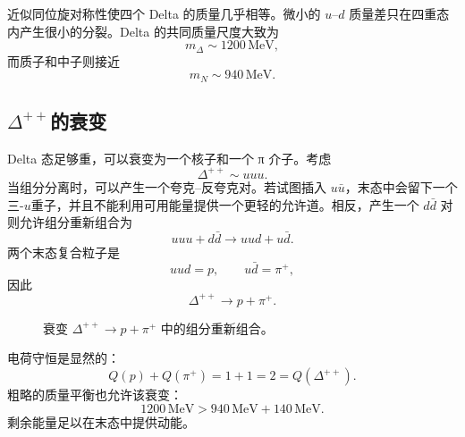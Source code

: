 近似同位旋对称性使四个 Delta 的质量几乎相等。微小的 \(u\)--\(d\) 质量差只在四重态内产生很小的分裂。Delta 的共同质量尺度大致为
\begin{equation}
m_\Delta\sim1200\,\mathrm{MeV},
\end{equation}
而质子和中子则接近
\begin{equation}
m_N\sim940\,\mathrm{MeV}.
\end{equation}

\subsection{\texorpdfstring{\(\Delta^{++}\)}{Delta++}的衰变}

Delta 态足够重，可以衰变为一个核子和一个 {\proseunicodefont π} 介子。考虑
\begin{equation}
\Delta^{++}\sim uuu.
\end{equation}
当组分分离时，可以产生一个夸克--反夸克对。若试图插入 \(u\bar u\)，末态中会留下一个三-\(u\)重子，并且不能利用可用能量提供一个更轻的允许道。相反，产生一个 \(d\bar d\) 对则允许组分重新组合为
\begin{equation}
uuu+d\bar d
\longrightarrow
uud+u\bar d.
\end{equation}
两个末态复合粒子是
\begin{equation}
uud=p,
\qquad
u\bar d=\pi^+,
\end{equation}
因此
\begin{equation}
\Delta^{++}\longrightarrow p+\pi^+.
\end{equation}

\begin{figure}[h]
\centering
{}
\caption{衰变 \(\Delta^{++}\rightarrow p+\pi^+\) 中的组分重新组合。}
\end{figure}

电荷守恒是显然的：
\begin{equation}
Q(p)+Q(\pi^+)=1+1=2=Q(\Delta^{++}).
\end{equation}
粗略的质量平衡也允许该衰变：
\begin{equation}
1200\,\mathrm{MeV}
>
940\,\mathrm{MeV}+140\,\mathrm{MeV}.
\end{equation}
剩余能量足以在末态中提供动能。


